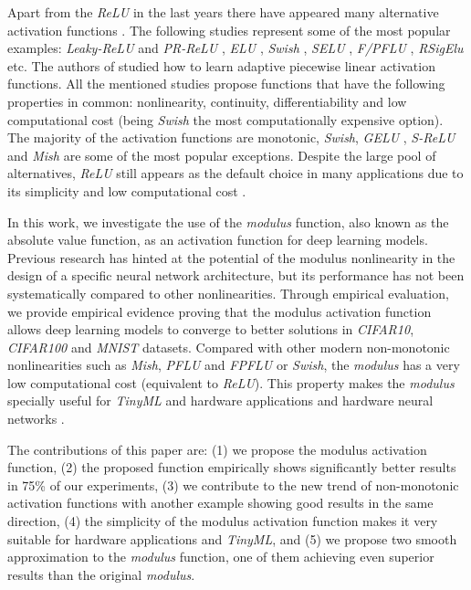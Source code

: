 \documentclass[authoryear]{elsarticle}
\begin{document}
Apart from the \textit{ReLU} in the last years there have appeared many alternative activation functions \citep{dubey2022}. The following studies represent some of the most popular examples: \textit{Leaky-ReLU} and \textit{PR-ReLU} \citep{xu2015}, \textit{ELU} \citep{djork2016}, \textit{Swish} \citep{ramachandran2018}, \textit{SELU} \citep{klambauer2017}, \textit{F/PFLU} \citep{zhu2020}, \textit{RSigElu} \citep{Kilicarslan2021} etc. The authors of \citep{agostinelli2014} studied how to learn adaptive piecewise linear activation functions. All the mentioned studies propose functions that have the following properties in common: nonlinearity, continuity, differentiability and low computational cost (being \textit{Swish} the most computationally expensive option). The majority of the activation functions are monotonic, \textit{Swish}, \textit{GELU} \citep{hendrycks2016},  \textit{S-ReLU} \citep{Jin2016} and \textit{Mish} \citep{misra2019mish} are some of the most popular exceptions. Despite the large pool of alternatives, \textit{ReLU} still appears as the default choice in many applications due to its simplicity and low computational cost \citep{nair2010}.

In this work, we investigate the use of the \textit{modulus} function, also known as the absolute value function, as an activation function for deep learning models. Previous research \citep{karnewar2018} has hinted at the potential of the modulus nonlinearity in the design of a specific neural network architecture, but its performance has not been systematically compared to other nonlinearities. Through empirical evaluation, we provide empirical evidence proving that the modulus activation function allows deep learning models to converge to better solutions in \textit{CIFAR10}, \textit{CIFAR100} and \textit{MNIST} datasets. Compared with other modern non-monotonic nonlinearities such as \textit{Mish}, \textit{PFLU} and \textit{FPFLU} or \textit{Swish}, the \textit{modulus} has a very low computational cost (equivalent to \textit{ReLU}). This property makes the \textit{modulus} specially useful for \textit{TinyML} and hardware applications \citep{sanchez2020} and hardware neural networks \citep{Misra2010}. 


The contributions of this paper are: (1) we propose the modulus activation function, (2) the proposed function empirically shows significantly better results in 75\% of our experiments, (3) we contribute to the new trend of non-monotonic activation functions with another example showing good results in the same direction, (4) the simplicity of the modulus activation function makes it very suitable for hardware applications and \textit{TinyML}, and (5) we propose two smooth approximation to the \textit{modulus} function, one of them achieving even superior results than the original \textit{modulus}.
\end{document}
